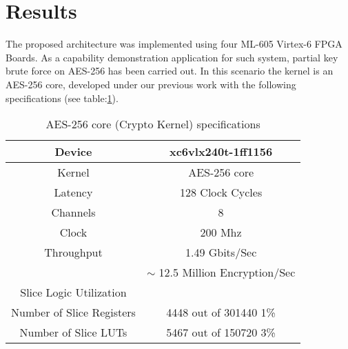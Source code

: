 \documentclass[10pt, conference, compsocconf]{IEEEtran}
\begin{document}

\section{Results}

The proposed architecture was implemented using four ML-605 Virtex-6 FPGA Boards. As a capability demonstration application for such system, partial key brute force on AES-256 has been carried out. In this scenario the kernel is an AES-256 core, developed under our previous work \cite{bajpaidesign} with the following specifications (see table:\ref{tab:AES}). 

\begin{table}[!htbp]
  \caption{AES-256 core (Crypto Kernel) specifications}
  \label{tab:AES}

  \begin{center}
    \begin{tabular}{|c|c|}
      \hline
       Device & xc6vlx240t-1ff1156\\
      \hline
       Kernel & AES-256 core\\
      \hline
       Latency & 128 Clock Cycles\\
      \hline
       Channels & 8\\
      \hline
       Clock & 200 Mhz\\
      \hline
       Throughput & 1.49 Gbits/Sec\\
       & $\sim$ 12.5 Million Encryption/Sec\\
      \hline
       Slice Logic Utilization & \\
      \hline
       Number of Slice Registers &  4448  out of  301440  1\% \\ 
      \hline
       Number of Slice LUTs &  5467  out of  150720 3\% \\ 
      \hline      
    \end{tabular}
  \end{center}
\end{table}


\end{document}
